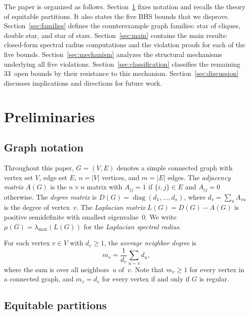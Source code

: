 \documentclass[preprint,12pt]{elsarticle}
\theoremstyle{definition}
\theoremstyle{remark}
\newcommand{\Lspec}{\mu}               %
\begin{document}
The paper is organized as follows. Section~\ref{sec:prelim} fixes
notation and recalls the theory of equitable partitions. It also states
the five BHS bounds that we disprove. Section~\ref{sec:families} defines
the counterexample graph families: star of cliques, double star, and star
of stars. Section~\ref{sec:main} contains the main results: closed-form
spectral radius computations and the violation proofs for each of the
five bounds. Section~\ref{sec:mechanism} analyzes the structural
mechanisms underlying all five violations.
Section~\ref{sec:classification} classifies the remaining 33~open bounds
by their resistance to this mechanism. Section~\ref{sec:discussion}
discusses implications and directions
for future work.


\section{Preliminaries}\label{sec:prelim}

\subsection{Graph notation}\label{ssec:notation}

Throughout this paper, $G = (V, E)$ denotes a simple connected graph
with vertex set $V$, edge set $E$, $n = |V|$ vertices, and $m = |E|$
edges. The \emph{adjacency matrix} $A(G)$ is the $n \times n$ matrix
with $A_{ij} = 1$ if $\{i,j\} \in E$ and $A_{ij} = 0$ otherwise. The
\emph{degree matrix} is $D(G) = \operatorname{diag}(d_1, \ldots, d_n)$,
where $d_v = \sum_{u} A_{vu}$ is the degree of vertex~$v$. The
\emph{Laplacian matrix} $L(G) = D(G) - A(G)$ is positive semidefinite
with smallest eigenvalue~$0$. We write
$\Lspec(G) = \lambda_{\max}(L(G))$ for the \emph{Laplacian spectral
radius}.

For each vertex $v \in V$ with $d_v \geq 1$, the \emph{average neighbor
degree} is
\[
  m_v = \frac{1}{d_v} \sum_{u \sim v} d_u,
\]
where the sum is over all neighbors~$u$ of~$v$. Note that $m_v \geq 1$
for every vertex in a connected graph, and $m_v = d_v$ for every vertex
if and only if $G$ is regular.

\subsection{Equitable partitions}\label{ssec:equitable}
\end{document}
